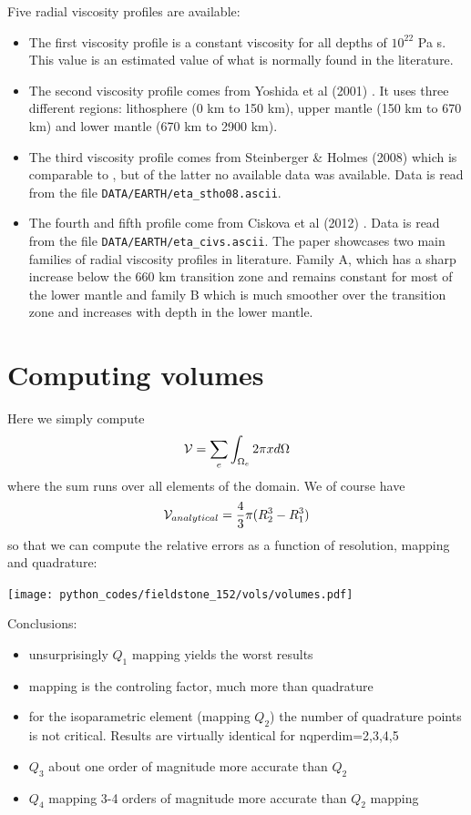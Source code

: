 Five radial viscosity profiles are available:
\begin{itemize}
\item The first viscosity profile is a constant viscosity for all depths of $10^{22}$ Pa s.  
This value is an estimated value of what is normally found in the literature. 

\item The second viscosity profile comes from Yoshida et al (2001) \cite{yohk01}. It uses three different regions: lithosphere (0 km to 150 km), upper mantle (150 km to 670 km) and lower mantle (670 km to 2900 km). 

\item The third viscosity profile comes from Steinberger \& Holmes (2008) \cite{stho08} 
which is comparable to \cite{stca06}, but of the latter no available data was available. 
Data is read from the file \texttt{DATA/EARTH/eta\_stho08.ascii}. 

\item The fourth and fifth profile come from Ciskova et al (2012) \cite{civs12}. 
Data is read from the file \texttt{DATA/EARTH/eta\_civs.ascii}. 
The paper showcases two main families of radial viscosity profiles in literature. Family A, which has a sharp 
increase below the 660 km transition zone and remains constant for most of the lower mantle 
and family B which is much smoother over the transition zone and increases with depth in the lower mantle. 

\end{itemize}




\newpage
\section*{Computing volumes}

Here we simply compute 
\[
{\cal V} = \sum_e \int_{\Omega_e} 2\pi x d\Omega
\]
where the sum runs over all elements of the domain.
We of course have 
\[
{\cal V}_{analytical} = \frac43 \pi (R_2^3-R_1^3)
\]
so that we can compute the relative errors as a function of resolution, mapping and quadrature: 
\begin{center}
\texttt{[image: python\_codes/fieldstone\_152/vols/volumes.pdf]}
\end{center}

\noindent Conclusions:
\begin{itemize}
\item unsurprisingly $Q_1$ mapping yields the worst results
\item mapping is the controling factor, much more than quadrature
\item for the isoparametric element (mapping $Q_2$) the number of quadrature points 
is not critical. Results are virtually identical for {\python nqperdim=2,3,4,5}
\item $Q_3$ about one order of magnitude more accurate than $Q_2$ 
\item $Q_4$ mapping 3-4 orders of magnitude more accurate than $Q_2$ mapping
\end{itemize}







